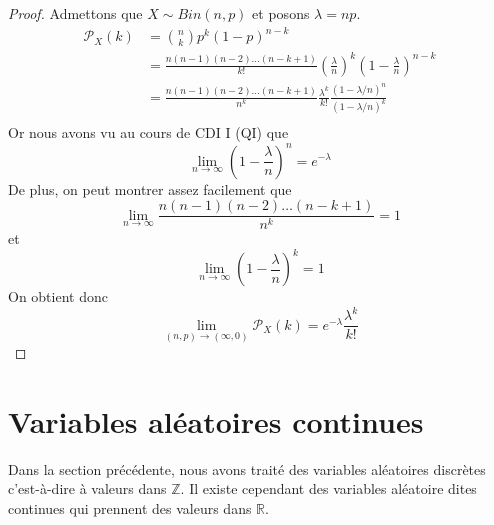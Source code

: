 \documentclass[a4paper,12pt]{report}
\theoremstyle{definition}
\newcommand{\ra}{\rightarrow}
\renewcommand{\(}{\left(}
\renewcommand{\)}{\right)}
\renewcommand{\P}{\mathcal{P}}
\begin{document}
            \begin{proof}
                Admettons que $X\sim Bin(n,p)$ et posons $\lambda = np$.
                \begin{align*}
                    \P_X(k) &= {n\choose k} p^k(1-p)^{n-k} \\
                    &= \frac{n(n-1)(n-2)\dots(n-k+1)}{k!} \left(\frac{\lambda}{n}\right)^k\left(1 -\frac{\lambda}{n}\right)^{n-k} \\
                    &= \frac{n(n-1)(n-2)\dots(n-k+1)}{n^k} \frac{\lambda^k}{k!}\frac{(1-\lambda/n)^n}{(1-\lambda/n)^k} \\
                \end{align*}
                Or nous avons vu au cours de CDI I (QI) que
                \begin{equation*}
                    \lim_{n \ra \infty} \left(1-\frac{\lambda}{n}\right)^n = e^{-\lambda}
                \end{equation*}
                De plus, on peut montrer assez facilement que
                \begin{equation*}
                    \lim_{n \ra \infty} \frac{n(n-1)(n-2)\dots(n-k+1)}{n^k} = 1
                \end{equation*}
                et 
                \begin{equation*}
                    \lim_{n \ra \infty} \left(1-\frac{\lambda}{n}\right)^k = 1
                \end{equation*}
                On obtient donc
                $$\lim_{(n,p) \ra (\infty, 0)}\P_X(k) = e^{-\lambda} \frac{\lambda^k}{k!}$$
            \end{proof}

    \section{Variables aléatoires continues}
    
        Dans la section précédente, nous avons traité des variables aléatoires discrètes c'est-à-dire à valeurs dans $\mathbb{Z}$. Il existe cependant des variables aléatoire dites continues qui prennent des valeurs dans $\mathbb{R}$.\\
        
\end{document}
